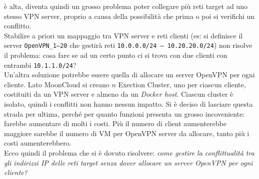 è alta, diventa
quindi un grosso problema poter collegare più
reti target ad uno stesso VPN server, proprio a causa della possibilità che prima o poi
si verifichi un conflitto.\\
Stabilire a priori un mappaggio tra VPN server e reti clienti (es: si definisce
il server \texttt{OpenVPN\_1--20} che gestirà reti \texttt{10.0.0.0/24 -- 10.20.20.0/24})
non risolve il problema: cosa fare se ad un certo punto ci si trova con due clienti con
entrambi \texttt{10.1.1.0/24}?\\
Un'altra soluzione potrebbe essere quella di allocare un server OpenVPN
per ogni cliente. Lato MoonCloud si creano $n$ Exection Cluster, uno per ciascun cliente,
costituiti da un VPN server e almeno da un \textit{Docker host}. Ciascun cluster è isolato,
quindi i conflitti non hanno nessun impatto. Si è deciso di lasciare questa strada per ultima,
perché per quanto funzioni presenta un grosso incoveniente: farebbe aumentare di molti i
costi. Più il numero di client aumenterebbe maggiore sarebbe il numero di VM per OpenVPN server
da allocare, tanto più i costi aumenterebbero.\\
Ecco quindi il problema che si è dovuto risolvere: \textit{come gestire
la conflittualità tra gli indirizzi IP delle reti target senza dover allocare un
server OpenVPN per ogni cliente?}


